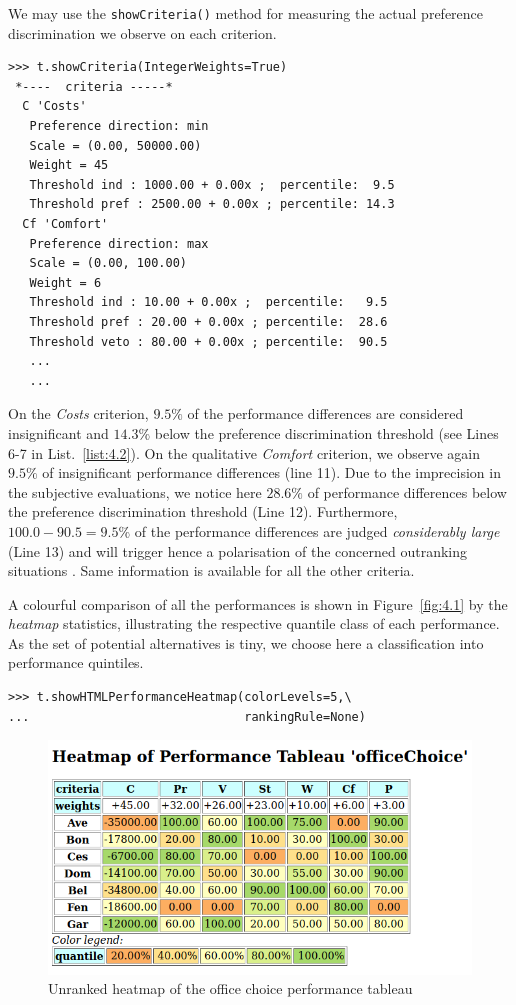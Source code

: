 We may use the \texttt{showCriteria()} method for measuring the actual preference discrimination we observe on each criterion.
\begin{lstlisting}[caption={Inspecting the performance criteria.},label=list:4.2]
>>> t.showCriteria(IntegerWeights=True)
 *----  criteria -----*
  C 'Costs'
   Preference direction: min
   Scale = (0.00, 50000.00)
   Weight = 45
   Threshold ind : 1000.00 + 0.00x ;  percentile:  9.5
   Threshold pref : 2500.00 + 0.00x ; percentile: 14.3
  Cf 'Comfort'
   Preference direction: max
   Scale = (0.00, 100.00)
   Weight = 6
   Threshold ind : 10.00 + 0.00x ;  percentile:   9.5
   Threshold pref : 20.00 + 0.00x ; percentile:  28.6
   Threshold veto : 80.00 + 0.00x ; percentile:  90.5
   ...
   ...
\end{lstlisting}

On the \emph{Costs} criterion, $9.5\%$ of the performance differences are considered insignificant and $14.3\%$ below the preference discrimination threshold (see Lines 6-7 in List.~\vref{list:4.2}). On the qualitative \emph{Comfort} criterion, we observe again $9.5\%$ of insignificant performance differences (line 11). Due to the imprecision in the subjective evaluations, we notice here $28.6\%$ of performance differences below the preference discrimination threshold (Line 12). Furthermore, $100.0 - 90.5 = 9.5\%$ of the performance differences are judged \emph{considerably large} (Line 13) and will trigger hence a polarisation of the concerned outranking situations \citep{BIS-2013}. Same information is available for all the other criteria. 
 
A colourful comparison of all the performances is shown in Figure~\vref{fig:4.1} by the \emph{heatmap} statistics, illustrating the respective quantile class of each performance. As the set of potential alternatives is tiny, we choose here a classification into performance quintiles.
\begin{lstlisting}
>>> t.showHTMLPerformanceHeatmap(colorLevels=5,\
...                              rankingRule=None)
\end{lstlisting}
    \begin{figure}[ht]
\includegraphics[width=\hsize]{Figures/4-1-officeChoiceHeatmap.png}
\caption{Unranked heatmap of the office choice performance tableau}
\label{fig:4.1}       %
\end{figure}

